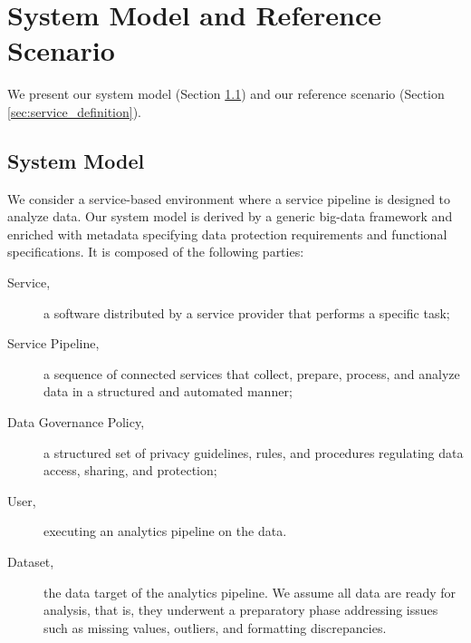 \section{System Model and Reference Scenario}\label{sec:requirements}
We present our system model (Section \ref{sec:systemmodel}) and our reference scenario (Section \ref{sec:service_definition}). %

\subsection{System Model}\label{sec:systemmodel}
We consider a service-based environment where a service pipeline is designed to analyze data. Our system model is derived by a generic big-data framework and enriched with metadata specifying data protection requirements and functional specifications. It is composed of the following parties: 
\begin{description}
  \item[Service,] a software distributed by a service provider that performs a specific task;   
  \item[Service Pipeline,] a sequence of connected services that collect, prepare, process, and analyze data in a structured and automated manner;
  \item[Data Governance Policy,] a structured set of privacy guidelines, rules, and procedures regulating data access, sharing, and protection; %
  \item[User,] executing an analytics pipeline on the data. 
  \item[Dataset,] the data target of the analytics pipeline. We assume all data are ready for analysis, that is, they underwent a preparatory phase addressing issues such as missing values, outliers, and formatting discrepancies. %
\end{description}

